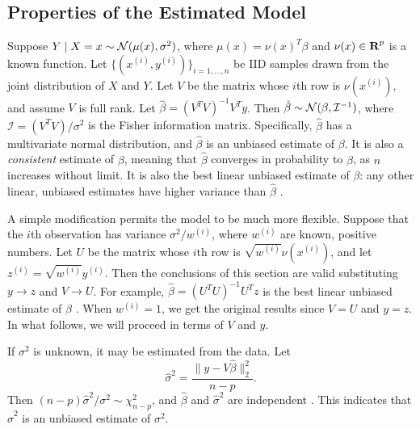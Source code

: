 \documentclass[12pt]{article}
\begin{document}
\subsection{Properties of the Estimated Model}
Suppose $Y \; | \; X = x \sim {\mathcal N} (\mu(x), \sigma^2)$, where $\mu(x) = \nu(x)^T \beta$ and $\nu(x) \in {\mbox{\bf R}}^p$ is a known function. Let $\{ (x^{(i)}, y^{(i)}) \}_{i=1, \ldots, n}$ be IID samples drawn from the joint distribution of $X$ and $Y$. Let $V$ be the matrix whose $i$th row is $\nu(x^{(i)})$, and assume $V$ is full rank. Let $\hat{\beta} = (V^T V)^{-1} V^T y$. Then $\hat{\beta} \sim {\mathcal N} (\beta, \mathcal{I}^{-1})$, where $\mathcal{I} = (V^T V) / \sigma^2$ is the Fisher information matrix. Specifically, $\hat{\beta}$ has a multivariate normal distribution, and $\hat{\beta}$ is an unbiased estimate of $\beta$. It is also a \textit{consistent} estimate of $\beta$, meaning that $\hat{\beta}$ converges in probability to $\beta$, as $n$ increases without limit. It is also the best linear unbiased estimate of $\beta$: any other linear, unbiased estimates have higher variance than $\hat{\beta}$ \cite[\S~1.3.9]{Wood:2017}.

A simple modification permits the model to be much more flexible. Suppose that the $i$th observation has variance $\sigma^2/w^{(i)}$, where $w^{(i)}$ are  known, positive numbers. Let $U$ be the matrix whose $i$th row is $\sqrt{w^{(i)}}\nu(x^{(i)})$, and let $z^{(i)} = \sqrt{w^{(i)}} y^{(i)}$. Then the conclusions of this section are valid substituting $y \to z$ and $V \to U$. For example, $\hat{\beta} = (U^T U)^{-1} U^T z$ is the best linear unbiased estimate of $\beta$ \cite[\S~5.1]{Weisberg:2005}. When $w^{(i)} = 1$, we get the original results since $V=U$ and $y=z$. In what follows, we will proceed in terms of $V$ and $y$.

If $\sigma^2$ is unknown, it may be estimated from the data. Let
\begin{equation}
   \hat{\sigma}^2 = \frac{\| y - V \hat{\beta} \|_2^2}{n-p}.
\end{equation}
Then $(n-p) \hat{\sigma}^2 / \sigma^2 \sim \chi_{n-p}^2$, and $\hat{\beta}$ and $\hat{\sigma}^2$ are independent \cite[\S~3.4.4]{Weisberg:2005}. This indicates that $\hat{\sigma}^2$ is an unbiased estimate of $\sigma^2$.
\end{document}

